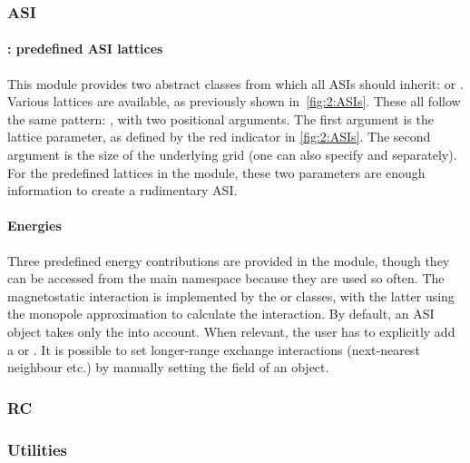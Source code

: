 \subsubsection{ASI}
\paragraph{: predefined ASI lattices}
This module provides two abstract classes from which all ASIs should inherit:  or .
Various lattices are available, as previously shown in~\cref{fig:2:ASIs}.
These all follow the same pattern: , with two positional arguments.
The first argument is the lattice parameter, as defined by the red indicator in \cref{fig:2:ASIs}.
The second argument is the size of the underlying grid (one can also specify  and  separately).
For the predefined lattices in the  module, these two parameters are enough information to create a rudimentary ASI.
\paragraph{Energies}\label{sec:2:API_energies}
Three predefined energy contributions are provided in the  module, though they can be accessed from the main  namespace because they are used so often.
The magnetostatic interaction is implemented by the  or  classes, with the latter using the monopole approximation to calculate the interaction.
By default, an ASI object takes only the  into account.
When relevant, the user has to explicitly add a  or .
It is possible to set longer-range exchange interactions (next-nearest neighbour etc.) by manually setting the  field of an  object.
\subsubsection{RC} %
\subsubsection{Utilities} %
